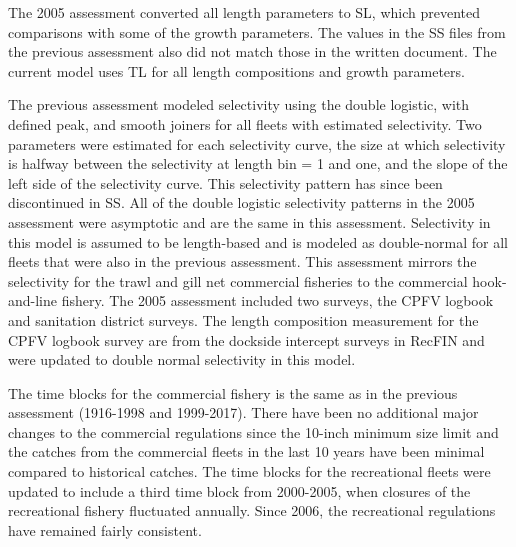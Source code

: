 \documentclass[12pt,]{article}
\begin{document}
The 2005 assessment converted all length parameters to SL, which
prevented comparisons with some of the growth parameters. The values in
the SS files from the previous assessment also did not match those in
the written document. The current model uses TL for all length
compositions and growth parameters.

The previous assessment modeled selectivity using the double logistic,
with defined peak, and smooth joiners for all fleets with estimated
selectivity. Two parameters were estimated for each selectivity curve,
the size at which selectivity is halfway between the selectivity at
length bin = 1 and one, and the slope of the left side of the
selectivity curve. This selectivity pattern has since been discontinued
in SS. All of the double logistic selectivity patterns in the 2005
assessment were asymptotic and are the same in this assessment.
Selectivity in this model is assumed to be length-based and is modeled
as double-normal for all fleets that were also in the previous
assessment. This assessment mirrors the selectivity for the trawl and
gill net commercial fisheries to the commercial hook-and-line fishery.
The 2005 assessment included two surveys, the CPFV logbook and
sanitation district surveys. The length composition measurement for the
CPFV logbook survey are from the dockside intercept surveys in RecFIN
and were updated to double normal selectivity in this model.

The time blocks for the commercial fishery is the same as in the
previous assessment (1916-1998 and 1999-2017). There have been no
additional major changes to the commercial regulations since the 10-inch
minimum size limit and the catches from the commercial fleets in the
last 10 years have been minimal compared to historical catches. The time
blocks for the recreational fleets were updated to include a third time
block from 2000-2005, when closures of the recreational fishery
fluctuated annually. Since 2006, the recreational regulations have
remained fairly consistent.
\end{document}
